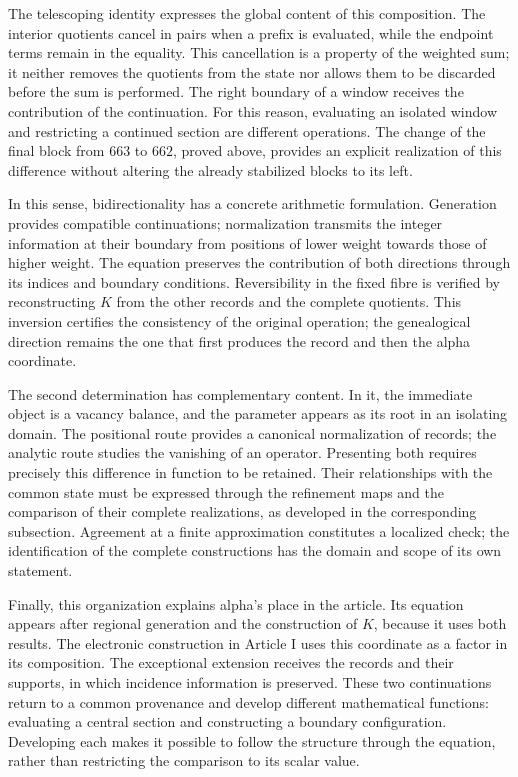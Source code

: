 The telescoping identity expresses the global content of this composition.
The interior quotients cancel in pairs when a prefix is evaluated,
while the endpoint terms remain in the equality. This cancellation is
a property of the weighted sum; it neither removes the quotients from the state nor
allows them to be discarded before the sum is performed. The right boundary of a
window receives the contribution of the continuation. For this reason,
evaluating an isolated window and restricting a continued section
are different operations. The change of the final block from $663$ to
$662$, proved above, provides an explicit realization of this
difference without altering the already stabilized blocks to its left.

In this sense, bidirectionality has a concrete arithmetic
formulation. Generation provides compatible continuations;
normalization transmits the integer information at their boundary from
positions of lower weight towards those of higher weight. The equation preserves the
contribution of both directions through its indices and boundary
conditions. Reversibility in the fixed fibre is verified by reconstructing
$K$ from the other records and the complete quotients. This
inversion certifies the consistency of the original operation; the genealogical
direction remains the one that first produces the record and then
the alpha coordinate.

The second determination has complementary content. In it, the
immediate object is a vacancy balance, and the parameter appears as
its root in an isolating domain. The positional route provides a
canonical normalization of records; the analytic route studies the vanishing
of an operator. Presenting both requires precisely this difference
in function to be retained. Their relationships with the common state must
be expressed through the refinement maps and the comparison of
their complete realizations, as developed in the corresponding
subsection. Agreement at a finite approximation constitutes a
localized check; the identification of the complete constructions
has the domain and scope of its own statement.

Finally, this organization explains alpha's place in the article.
Its equation appears after regional generation and the construction
of $K$, because it uses both results. The electronic construction in
Article I uses this coordinate as a factor in its composition. The exceptional
extension receives the records and their supports, in which incidence
information is preserved. These two continuations return to a common
provenance and develop different mathematical functions: evaluating a
central section and constructing a boundary configuration.
Developing each makes it possible to follow the structure through the
equation, rather than restricting the comparison to its scalar value.

